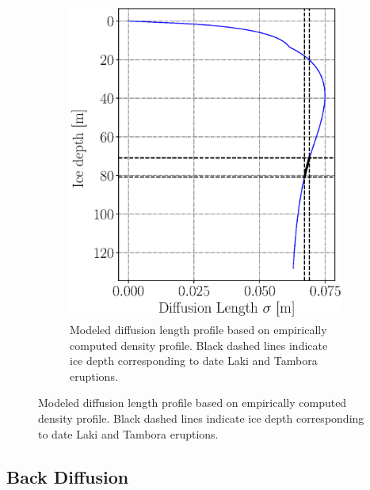 \documentclass{beamer}[10]
\begin{document}
{\begin{figure}
\begin{subfigure}{.45\textwidth}
			\includegraphics[width=\linewidth]{SiteA_DiffLen.eps}
			\caption[Diffusion length profile, Site A]{\tiny Modeled diffusion length profile based on empirically computed density profile. Black dashed lines indicate ice depth corresponding to date Laki and Tambora eruptions.}
			\label{fig:SiteA_DiffLen}
		\end{subfigure}
		\label{fig:CFM}
	\end{figure}
}




\subsection{Back Diffusion}
\end{document}
